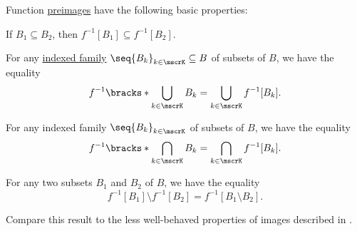 \begin{proposition}\label{thm:function_preimage_properties}
  Function \hyperref[def:set_valued_map/inverse]{preimages} have the following basic properties:
  \begin{thmenum}
     If \( B_1 \subseteq B_2 \), then \( f^{-1}[B_1] \subseteq f^{-1}[B_2] \).

     For any \hyperref[def:indexed_family]{indexed family} \( \seq{ B_k }_{k \in \mscrK} \subseteq B \) of subsets of \( B \), we have the equality
    \begin{equation}\label{eq:thm:function_preimage_properties/union}
      f^{-1}\bracks*{ \bigcup_{k \in \mscrK} B_k } = \bigcup_{k \in \mscrK} f^{-1}[B_k].
    \end{equation}

     For any indexed family \( \seq{ B_k }_{k \in \mscrK} \) of subsets of \( B \), we have the equality
    \begin{equation}\label{eq:thm:function_preimage_properties/intersection}
      f^{-1}\bracks*{ \bigcap_{k \in \mscrK} B_k } = \bigcap_{k \in \mscrK} f^{-1}[B_k].
    \end{equation}

     For any two subsets \( B_1 \) and \( B_2 \) of \( B \), we have the equality
    \begin{equation}\label{eq:thm:function_preimage_properties/difference}
      f^{-1}[B_1] \setminus f^{-1}[B_2] = f^{-1}[B_1 \setminus B_2].
    \end{equation}
  \end{thmenum}
\end{proposition}
\begin{comments}
  \item Compare this result to the less well-behaved properties of images described in .
\end{comments}
